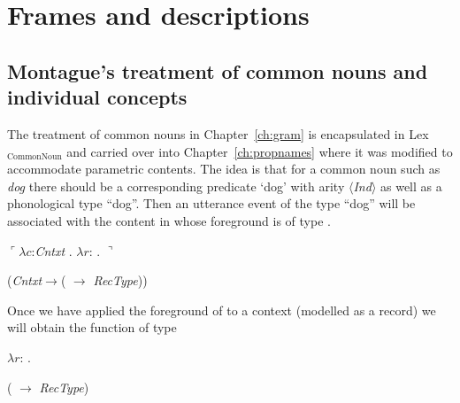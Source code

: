 \chapter{Frames and descriptions}
\label{ch:commonnouns}
\setcounter{equation}{0}

\section[Montague's treatment of common nouns and individual
concepts][Montague's treatment of common nouns]{Montague's treatment of
  common nouns and  individual concepts}
The treatment of common nouns in Chapter~\ref{ch:gram} is encapsulated
in Lex$_{\mathrm{CommonNoun}}$ and carried over into
Chapter~\ref{ch:propnames} where it was modified to accommodate
parametric contents.
The idea is that for a common noun such as \textit{dog} there should
be a corresponding predicate `dog' with arity
$\langle$\textit{Ind}$\rangle$ as well as a phonological type
``dog''.  Then an utterance event of the type ``dog'' will be
associated with the content in  whose foreground is of type
. 
\begin{ex} 
\begin{subex}
\item $\ulcorner\lambda c$:\textit{Cntxt} . $\lambda r$:
  . $\urcorner$ 
\item
  (\textit{Cntxt}$\rightarrow$( $\rightarrow$ \textit{RecType}))
\end{subex}
\label{ex:dog}
\end{ex}
Once we have applied the foreground of  to a context
(modelled as a record) we will obtain the function  of type
\begin{ex}
  \label{ex:non-paradog}
\begin{subex} 
 
\item  $\lambda r$:
  . 
\item
  ( $\rightarrow$ \textit{RecType})
 

 
\end{subex} 
   
\end{ex} 
